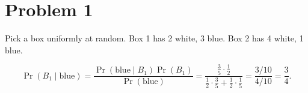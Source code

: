 \section*{Problem 1}

Pick a box uniformly at random. Box 1 has 2 white, 3 blue. Box 2 has 4 white, 1 blue.

\[
\Pr(B_1\mid \text{blue})
=\frac{\Pr(\text{blue}\mid B_1)\Pr(B_1)}{\Pr(\text{blue})}
=\frac{\frac{3}{5}\cdot \frac12}{\frac12\cdot\frac{3}{5}+\frac12\cdot\frac{1}{5}}
=\frac{3/10}{4/10}=\frac34.
\]
